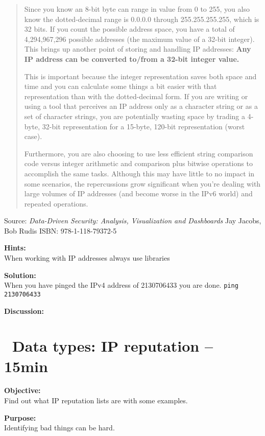 \documentclass[a4paper,11pt,notitlepage]{report}
\begin{document}
\begin{quote}
Since you know an 8-bit byte can range in value from 0 to 255, you also know the dotted-decimal range is 0.0.0.0 through 255.255.255.255, which is 32 bits. If you count the possible address space, you have a total of 4,294,967,296 possible addresses (the maximum value of a 32-bit integer). This brings up another point of storing and handling IP addresses: {\bf Any IP address can be converted to/from a 32-bit integer value.}

This is important because the integer representation saves both space and time and you can calculate some things a bit easier with that representation than with the dotted-decimal form. If you are writing or using a tool that perceives an IP address only as a character string or as a set of character strings, you are potentially wasting space by trading a 4-byte, 32-bit representation for a 15-byte, 120-bit representation (worst case).

Furthermore, you are also choosing to use less efficient string comparison code versus integer arithmetic and comparison plus bitwise operations to accomplish the same tasks. Although this may have little to no impact in some scenarios, the repercussions grow significant when you’re dealing with large volumes of IP addresses (and become worse in the IPv6 world) and repeated operations.
\end{quote}
Source: \emph{Data-Driven Security: Analysis, Visualization and Dashboards} Jay Jacobs, Bob Rudis  ISBN: 978-1-118-79372-5


{\bf Hints:}\\
When working with IP addresses always use libraries

{\bf Solution:}\\
When you have pinged the IPv4 address of 2130706433 you are done.
\verb+ping 2130706433+


{\bf Discussion:}\\



\chapter{\faExclamationTriangle\ Data types: IP reputation -- 15min}
\label{siem:ip-reputation}

{\bf Objective:}\\
Find out what IP reputation lists are with some examples.


{\bf Purpose:}\\
Identifying bad things can be hard.
\end{document}
